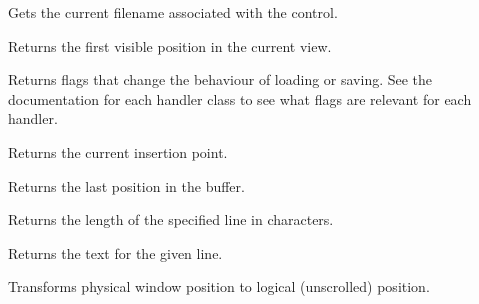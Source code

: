 \label{wxrichtextctrlgetfilename}


Gets the current filename associated with the control.

\label{wxrichtextctrlgetfirstvisibleposition}


Returns the first visible position in the current view.

\label{wxrichtextfilehandlergethandlerflags}


Returns flags that change the behaviour of loading or saving. See the documentation for each
handler class to see what flags are relevant for each handler.

\label{wxrichtextctrlgetinsertionpoint}


Returns the current insertion point.

\label{wxrichtextctrlgetlastposition}


Returns the last position in the buffer.

\label{wxrichtextctrlgetlinelength}


Returns the length of the specified line in characters.

\label{wxrichtextctrlgetlinetext}


Returns the text for the given line.

\label{wxrichtextctrlgetlogicalpoint}


Transforms physical window position to logical (unscrolled) position.

\label{wxrichtextctrlgetnumberoflines}

